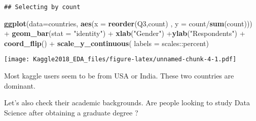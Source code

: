 \documentclass[]{article}
\newenvironment{Shaded}{\begin{snugshade}}{\end{snugshade}}
\newcommand{\KeywordTok}[1]{\textcolor[rgb]{0.13,0.29,0.53}{\textbf{{#1}}}}
\newcommand{\DataTypeTok}[1]{\textcolor[rgb]{0.13,0.29,0.53}{{#1}}}
\newcommand{\DecValTok}[1]{\textcolor[rgb]{0.00,0.00,0.81}{{#1}}}
\newcommand{\FloatTok}[1]{\textcolor[rgb]{0.00,0.00,0.81}{{#1}}}
\newcommand{\StringTok}[1]{\textcolor[rgb]{0.31,0.60,0.02}{{#1}}}
\newcommand{\NormalTok}[1]{{#1}}
\begin{document}
\begin{Shaded}
\end{Shaded}

\begin{verbatim}
## Selecting by count
\end{verbatim}

\begin{Shaded}
\begin{Highlighting}[]
\KeywordTok{ggplot}\NormalTok{(}\DataTypeTok{data=}\NormalTok{countries, }\KeywordTok{aes}\NormalTok{(}\DataTypeTok{x =} \KeywordTok{reorder}\NormalTok{(Q3,count) , }\DataTypeTok{y =} \NormalTok{count/}\KeywordTok{sum}\NormalTok{(count))) +}\StringTok{ }\KeywordTok{geom_bar}\NormalTok{(}\DataTypeTok{stat =} \StringTok{"identity"}\NormalTok{) +}\StringTok{ }\KeywordTok{xlab}\NormalTok{(}\StringTok{"Gender"}\NormalTok{) +}\KeywordTok{ylab}\NormalTok{(}\StringTok{"Respondents"}\NormalTok{)  +}\StringTok{ }\KeywordTok{coord_flip}\NormalTok{() +}\StringTok{ }\KeywordTok{scale_y_continuous}\NormalTok{( }\DataTypeTok{labels =} \NormalTok{scales::percent) }
\end{Highlighting}
\end{Shaded}

\texttt{[image: Kaggle2018\_EDA\_files/figure-latex/unnamed-chunk-4-1.pdf]}

Most kaggle users seem to be from USA or India. These two countries are
dominant.

Let's also check their academic backgrounds. Are people looking to study
Data Science after obtaining a graduate degree ?

\begin{Shaded}
\end{Shaded}
\end{document}
